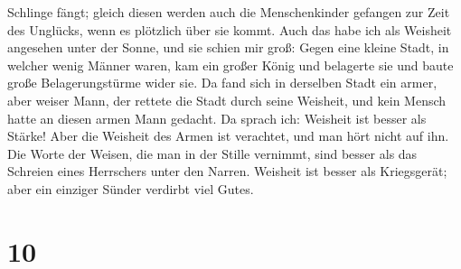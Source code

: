 Schlinge fängt; gleich diesen werden auch die Menschenkinder gefangen
zur Zeit des Unglücks, wenn es plötzlich über sie kommt. 
Auch das habe ich als Weisheit angesehen unter der Sonne, und sie schien
mir groß:  Gegen eine kleine Stadt, in welcher wenig
Männer waren, kam ein großer König und belagerte sie und baute große
Belagerungstürme wider sie.  Da fand sich in derselben
Stadt ein armer, aber weiser Mann, der rettete die Stadt durch seine
Weisheit, und kein Mensch hatte an diesen armen Mann gedacht.
 Da sprach ich: Weisheit ist besser als Stärke! Aber die
Weisheit des Armen ist verachtet, und man hört nicht auf ihn.
 Die Worte der Weisen, die man in der Stille vernimmt,
sind besser als das Schreien eines Herrschers unter den Narren.
 Weisheit ist besser als Kriegsgerät; aber ein einziger
Sünder verdirbt viel Gutes.

\hypertarget{section-9}{%
\section{10}\label{section-9}}

